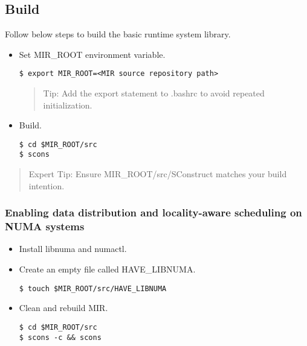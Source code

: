 \documentclass[11pt,a4paper]{article}
\begin{document}
\subsection{Build}\label{build}

Follow below steps to build the basic runtime system library.

\begin{itemize}
\item Set MIR\_ROOT environment variable.

\begin{lstlisting}[style=MyInputStyle]
$ export MIR_ROOT=<MIR source repository path>
\end{lstlisting}

\begin{framed}
\begin{quote}
Tip: Add the export statement to .bashrc to avoid repeated initialization.
\end{quote}
\end{framed}

\item Build.

\begin{lstlisting}[style=MyInputStyle]
$ cd $MIR_ROOT/src
$ scons
\end{lstlisting}
\end{itemize}

\begin{framed}
\begin{quote}
Expert Tip: Ensure MIR\_ROOT/src/SConstruct matches your build intention.
\end{quote}
\end{framed}

\subsubsection{Enabling data distribution and locality-aware scheduling on NUMA systems}\label{enabling-data-distribution-and-locality-aware-scheduling-on-numa-systems}

\begin{itemize}
\item Install libnuma and numactl.
\item Create an empty file called HAVE\_LIBNUMA.

\begin{lstlisting}[style=MyInputStyle]
$ touch $MIR_ROOT/src/HAVE_LIBNUMA
\end{lstlisting}

\item Clean and rebuild MIR.

\begin{lstlisting}[style=MyInputStyle]
$ cd $MIR_ROOT/src
$ scons -c && scons
\end{lstlisting}
\end{itemize}
\end{document}

